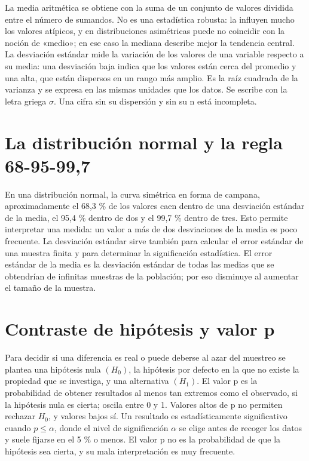 \documentclass{book}
\begin{document}
La media aritmética se obtiene con la suma de un conjunto de valores dividida entre el número de sumandos. No es una estadística robusta: la influyen mucho los valores atípicos, y en distribuciones asimétricas puede no coincidir con la noción de «medio»; en ese caso la mediana describe mejor la tendencia central. La desviación estándar mide la variación de los valores de una variable respecto a su media: una desviación baja indica que los valores están cerca del promedio y una alta, que están dispersos en un rango más amplio. Es la raíz cuadrada de la varianza y se expresa en las mismas unidades que los datos. Se escribe con la letra griega \(\sigma\). Una cifra sin su dispersión y sin su n está incompleta.


\section{La distribución normal y la regla 68-95-99,7}

En una distribución normal, la curva simétrica en forma de campana, aproximadamente el 68,3 \% de los valores caen dentro de una desviación estándar de la media, el 95,4 \% dentro de dos y el 99,7 \% dentro de tres. Esto permite interpretar una medida: un valor a más de dos desviaciones de la media es poco frecuente. La desviación estándar sirve también para calcular el error estándar de una muestra finita y para determinar la significación estadística. El error estándar de la media es la desviación estándar de todas las medias que se obtendrían de infinitas muestras de la población; por eso disminuye al aumentar el tamaño de la muestra.


\section{Contraste de hipótesis y valor p}

Para decidir si una diferencia es real o puede deberse al azar del muestreo se plantea una hipótesis nula \((H_{0})\), la hipótesis por defecto en la que no existe la propiedad que se investiga, y una alternativa \((H_{1})\). El valor p es la probabilidad de obtener resultados al menos tan extremos como el observado, si la hipótesis nula es cierta; oscila entre 0 y 1. Valores altos de p no permiten rechazar \(H_{0}\), y valores bajos sí. Un resultado es estadísticamente significativo cuando \(p \leq \alpha\), donde el nivel de significación \(\alpha\) se elige antes de recoger los datos y suele fijarse en el 5 \% o menos. El valor p no es la probabilidad de que la hipótesis sea cierta, y su mala interpretación es muy frecuente.
\end{document}
